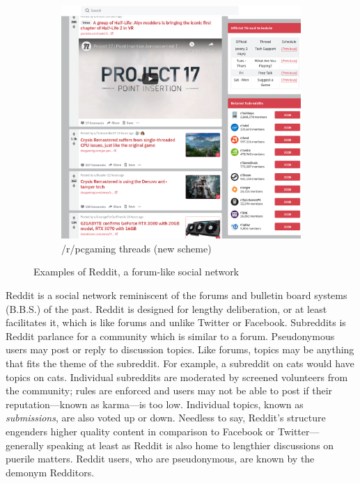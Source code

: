 \documentclass[12pt, a4paper]{article}
\begin{document}
\begin{figure}[h!]
\begin{subfigure}[b]{0.4\linewidth}
    \includegraphics[width=\linewidth]{reddit_pcgaming.png}
    \caption{/r/pcgaming threads (new scheme)}
  \end{subfigure}
  \label{fig:redditexamples}
  \caption{Examples of Reddit, a forum-like social network}
\end{figure}
Reddit is a social network reminiscent of the forums and bulletin board systems (B.B.S.) of the past. Reddit is designed for lengthy deliberation, or at least facilitates it, which is like forums and unlike Twitter or Facebook. Subreddits is Reddit parlance for a community which is similar to a forum. Pseudonymous users may post or reply to discussion topics. Like forums, topics may be anything that fits the theme of the subreddit. For example, a subreddit on cats would have topics on cats. Individual subreddits are moderated by screened volunteers from the community; rules are enforced and users may not be able to post if their reputation---known as karma---is too low. Individual topics, known as \textit{submissions}, are also voted up or down. Needless to say, Reddit's structure engenders higher quality content in comparison to Facebook or Twitter---generally speaking at least as Reddit is also home to lengthier discussions on puerile matters. Reddit users, who are pseudonymous, are known by the demonym Redditors.
\end{document}
